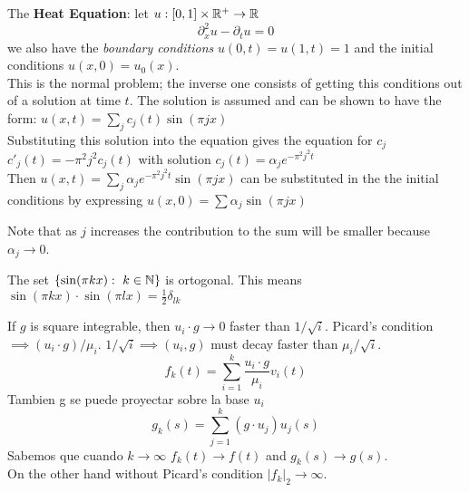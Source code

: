 The \textbf{Heat Equation}: let $u:[0,1]\times \mathbb{R}^+ \to \mathbb{R}$ 
$$ \partial_x^2 u - \partial_t u = 0$$
we also have the \emph{boundary conditions} $u(0,t)=u(1,t)=1$ and the initial conditions $u(x,0)=u_0(x)$.\\
This is the normal problem; the inverse one consists of getting this conditions out of a solution at time $t$. The solution is assumed and can be shown to have the form: $u(x,t)=\sum_j c_j(t)\sin(\pi j x)$\\
Substituting this solution into the equation gives the equation for $c_j$ $c'_j(t)=-\pi^2 j^2 c_j(t)$ with solution $c_j(t) = \alpha_j e^{-\pi^2j^2 t}$ \\
Then $u(x,t)=\sum_j \alpha_j e^{-\pi^2j^2 t} \sin(\pi j x)$ can be substituted in the the initial conditions by expressing $u(x,0)=\sum \alpha_j \sin(\pi j x)$
\begin{remarks}
Note that as $j $ increases the contribution to the sum will be smaller because $\alpha_j\to 0$.
\end{remarks}

The set $\{\sin(\pi k x): \ k\in \mathbb{N} \}$ is ortogonal. This means $\sin(\pi k x)\cdot \sin(\pi l x)= \frac{1}{2}\delta_{lk}$ 

If $g$ is square integrable, then $u_i\cdot g \to 0$ faster than $1/\sqrt{i}$. Picard's condition $\implies (u_i\cdot g)/\mu_i$. $1/\sqrt{i}\implies (u_i,g)$ must decay faster than $\mu_i/\sqrt{i}$. 
$$f_k(t) = \sum_{i=1}^k \frac{u_i\cdot g}{\mu_i} v_i(t)$$   
Tambien g se puede proyectar sobre la base $u_i$
$$g_k(s) = \sum_{j=1}^k (g\cdot u_j)u_j(s)$$
Sabemos que cuando $k\to \infty$ $f_k(t)\to f(t)$ and $g_k(s)\to g(s)$.\\
On the other hand without Picard's condition $|f_k|_2\to \infty$.
